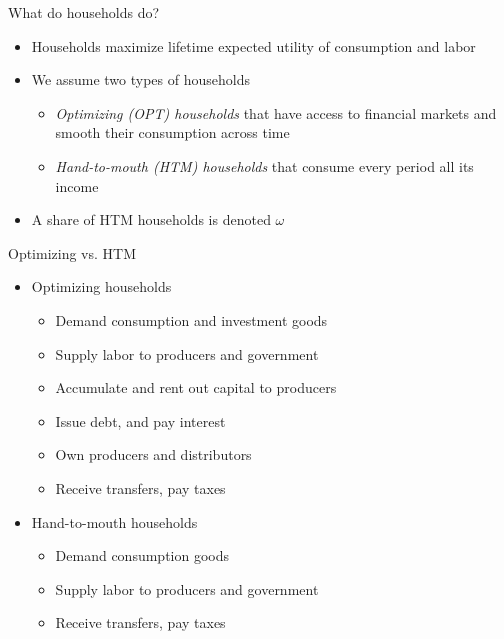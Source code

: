 \begin{frame}{What do households do?}
  
  \begin{itemize}
    \item Households maximize lifetime expected utility of consumption and labor
    \item We assume two types of households 
    \begin{itemize}
      \item \emph{Optimizing (OPT) households} that have access to financial markets and smooth their consumption across time
      \item \emph{Hand-to-mouth (HTM) households} that consume every period all its income
    \end{itemize}
    \item A share of HTM households is denoted $\omega$
  \end{itemize}
  
\end{frame}

\begin{frame}{Optimizing vs. HTM}
  
  \begin{itemize}
    \item Optimizing households
    \begin{itemize}
      \item Demand consumption and investment goods
      \item Supply labor to producers and government
      \item Accumulate and rent out capital to producers
      \item Issue debt, and pay interest
      \item Own producers and distributors
      \item Receive transfers, pay taxes
    \end{itemize}
    \item Hand-to-mouth households
    \begin{itemize}
      \item Demand consumption goods
      \item Supply labor to producers and government
      \item Receive transfers, pay taxes
    \end{itemize}
    
  \end{itemize}
\end{frame}

